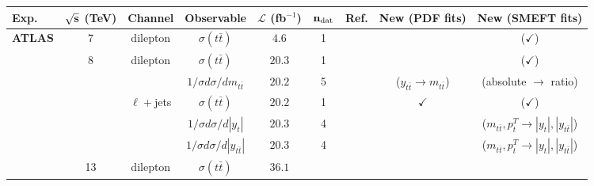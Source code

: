 \begin{table}[H]
  \begin{center}
{\fontsize{8pt}{8pt}\selectfont
  \centering
   \renewcommand{\arraystretch}{1.5}
   \setlength{\tabcolsep}{2pt}
   \begin{tabular}{lcccccc|c|c}
     \toprule \textbf{Exp.}   & $\bf{\sqrt{s}}$ \textbf{(TeV)}    &   \textbf{Channel}
    &  \textbf{Observable} & $\mathcal{L}$ (fb${}^{-1}$) & $\mathbf{n_{\rm dat}}$ & \textbf{Ref.}
     &\textbf{New (PDF fits)}
    &  \textbf{New (SMEFT fits)}\\
    \toprule
    \multirow{1}{*}{
      \bf ATLAS}
      & 7
      & dilepton
      & $\sigma(t\bar{t})$
      & $4.6$
      & 1
      & \cite{ATLAS:2014nxi}
      &
      & ($\checkmark$)\\\midrule
      & 8
      & dilepton
      & $\sigma(t\bar{t})$
      & $20.3$
      & 1
      & \cite{ATLAS:2014nxi}
      &
      & ($\checkmark$)\\
      & 
      & 
      & $1/\sigma d\sigma/dm_{t\bar{t}}$
      & $20.2$
      & 5
      & \cite{Aaboud:2016iot}
      & ($y_{t\bar{t}} \rightarrow m_{t\bar{t}}$)
      & (absolute $\rightarrow$ ratio)\\
      & 
      & $\ell+$jets
      & $\sigma(t\bar{t})$
      & $20.2$
      & 1
      & \cite{ATLAS:2017wvi}
      & $\checkmark$
      & ($\checkmark$)\\
      & 
      & 
      & $1/\sigma d\sigma/d|y_{t}|$
      & $20.3$
      & 4
      & \cite{Aad:2015mbv}
      &
      & ($m_{t\bar{t}}, p_t^T \rightarrow |y_t|, |y_{t\bar{t}}|$)\\
      & 
      &
      & $1/\sigma d\sigma/d|y_{t\bar{t}}|$
      & $20.3$
      & 4
      & \cite{Aad:2015mbv}
      &
      & ($m_{t\bar{t}}, p_t^T \rightarrow |y_t|, |y_{t\bar{t}}|$)\\\midrule
      & 13
      & dilepton
      & $\sigma(t \bar{t})$
      & $36.1$

\end{tabular}}
\end{center}
\end{table}
